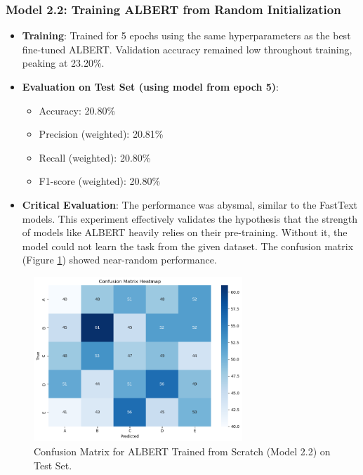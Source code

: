 \documentclass[10.5pt]{article}
\begin{document}
\subsubsection{Model 2.2: Training ALBERT from Random Initialization}
\begin{itemize}
    \item \textbf{Training}: Trained for 5 epochs using the same hyperparameters as the best fine-tuned ALBERT. Validation accuracy remained low throughout training, peaking at 23.20\%.
    \item \textbf{Evaluation on Test Set (using model from epoch 5)}:
        \begin{itemize}
            \item Accuracy: 20.80\%
            \item Precision (weighted): 20.81\%
            \item Recall (weighted): 20.80\%
            \item F1-score (weighted): 20.80\%
        \end{itemize}
    \item \textbf{Critical Evaluation}: The performance was abysmal, similar to the FastText models. This experiment effectively validates the hypothesis that the strength of models like ALBERT heavily relies on their pre-training. Without it, the model could not learn the task from the given dataset. The confusion matrix (Figure \ref{fig:conf_matrix_model2_2}) showed near-random performance.
\end{itemize}

\begin{figure}[htbp]
    \centering
    \includegraphics[width=0.7\textwidth]{images/model2_2_confusion_matrix.png}
    \caption{Confusion Matrix for ALBERT Trained from Scratch (Model 2.2) on Test Set.}
    \label{fig:conf_matrix_model2_2}
\end{figure}
\end{document}
